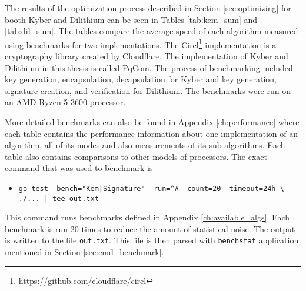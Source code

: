 The results of the optimization process described in Section \ref{sec:optimizing} for booth Kyber and Dilithium can be seen in Tables \ref{tab:kem_sum} and \ref{tab:dil_sum}. The tables compare the average speed of each algorithm measured using benchmarks for two implementations. The Circl\footnote{\url{https://github.com/cloudflare/circl}} implementation is a cryptography library created by Cloudflare. The implementation of Kyber and Dilithium in this thesis is called PqCom. The process of benchmarking included key generation, encapsulation, decapsulation for Kyber and key generation, signature creation, and verification for Dilithium. The benchmarks were run on an AMD Ryzen 5 3600 processor.


More detailed benchmarks can also be found in Appendix \ref{ch:performance} where each table contains the performance information about one implementation of an algorithm, all of its modes and also measurements of its sub algorithms. Each table also contains comparisons to other models of processors. The exact command that was used to benchmark is
\begin{itemize}
  \item \texttt{go test -bench="Kem|Signature" -run=\^{}\# -count=20 -timeout=24h \textbackslash\\ ./... | tee out.txt}
\end{itemize}
This command runs benchmarks defined in Appendix \ref{ch:available_algs}. Each benchmark is run 20 times to reduce the amount of statistical noise. The output is written to the file \texttt{out.txt}. This file is then parsed with \texttt{benchstat} application mentioned in Section \ref{sec:cmd_benchmark}.
